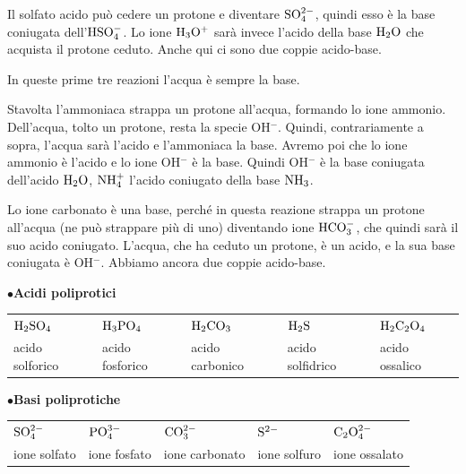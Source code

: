 \vspace{0.2cm}Il solfato acido può cedere un protone e diventare $\rm SO_4^{2-}$, quindi esso è la base coniugata dell'$\rm HSO_4^-$. Lo ione $\rm H_3O^+$ sarà invece l'acido della base $\rm H_2O$ che acquista il protone ceduto. Anche qui ci sono due coppie acido-base.

\vspace{0.2cm}In queste prime tre reazioni l'acqua è sempre la base.

\vspace{0.2cm}

\vspace{0.2cm}Stavolta l'ammoniaca strappa un protone all'acqua, formando lo ione ammonio. Dell'acqua, tolto un protone, resta la specie OH$^-$. Quindi, contrariamente a sopra, l'acqua sarà l'acido e l'ammoniaca la base. Avremo poi che lo ione ammonio è l'acido e lo ione OH$^-$ è la base. Quindi OH$^-$ è la base coniugata dell'acido $\rm H_2O$, $\rm NH_4^+$ l'acido coniugato della base $\rm NH_3$.

\vspace{0.2cm}

\vspace{0.2cm}Lo ione carbonato è una base, perché in questa reazione strappa un protone all'acqua (ne può strappare più di uno) diventando ione $\rm HCO_3^-$, che quindi sarà il suo acido coniugato. L'acqua, che ha ceduto un protone, è un acido, e la sua base coniugata è OH$^-$. Abbiamo ancora due coppie acido-base.

\vspace{0.2cm}$\bullet$\textbf{Acidi poliprotici}
\begin{center}
\begin{tabular}{lllll}
    $\rm H_2SO_4$ & $\rm H_3PO_4$ & $\rm H_2CO_3$ & $\rm H_2S$ & $\rm H_2C_2O_4$\\
    acido solforico & acido fosforico & acido carbonico & acido solfidrico & acido ossalico    
\end{tabular}
\end{center}
\vspace{0.2cm}$\bullet$\textbf{Basi poliprotiche}
\begin{center}
\begin{tabular}{lllll}
    $\rm SO_4^{2-}$ & $\rm PO_4^{3-}$ & $\rm CO_3^{2-}$ & $\rm S^{2-}$ & $\rm C_2O_4^{2-}$\\
    ione solfato & ione fosfato & ione carbonato & ione solfuro & ione ossalato    
\end{tabular}
\end{center}

